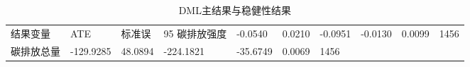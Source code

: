 \begin{table}
\caption{DML主结果与稳健性结果}
\label{tab:dml_main}
\begin{tabular}{lllllll}
\toprule
结果变量 & ATE & 标准误 & 95%
\midrule
碳排放强度 & -0.0540 & 0.0210 & -0.0951 & -0.0130 & 0.0099 & 1456 \\
碳排放总量 & -129.9285 & 48.0894 & -224.1821 & -35.6749 & 0.0069 & 1456 \\
\bottomrule
\end{tabular}
\end{table}
